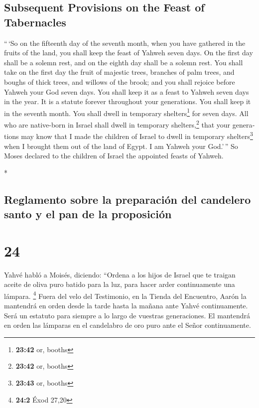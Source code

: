 \begin{paracol}{2}
\begin{otherlanguage}{english}
\hypertarget{subsequent-provisions-on-the-feast-of-tabernacles}{%
\subsection{Subsequent Provisions on the Feast of
Tabernacles}\label{subsequent-provisions-on-the-feast-of-tabernacles}}

 ``\,`So on the fifteenth day of the seventh month, when
you have gathered in the fruits of the land, you shall keep the feast of
Yahweh seven days. On the first day shall be a solemn rest, and on the
eighth day shall be a solemn rest.  You shall take on the
first day the fruit of majestic trees, branches of palm trees, and
boughs of thick trees, and willows of the brook; and you shall rejoice
before Yahweh your God seven days.  You shall keep it as
a feast to Yahweh seven days in the year. It is a statute forever
throughout your generations. You shall keep it in the seventh month.
 You shall dwell in temporary shelters\footnote{\textbf{23:42}
  or, booths} for seven days. All who are native-born in Israel shall
dwell in temporary shelters,\footnote{\textbf{23:42} or, booths}
 that your generations may know that I made the children
of Israel to dwell in temporary shelters\footnote{\textbf{23:43} or,
  booths} when I brought them out of the land of Egypt. I am Yahweh your
God.'\,''  So Moses declared to the children of Israel
the appointed feasts of Yahweh.

\end{otherlanguage}

\switchcolumn[0]*

\hypertarget{reglamento-sobre-la-preparaciuxf3n-del-candelero-santo-y-el-pan-de-la-proposiciuxf3n}{%
\subsection{Reglamento sobre la preparación del candelero santo y el pan
de la
proposición}\label{reglamento-sobre-la-preparaciuxf3n-del-candelero-santo-y-el-pan-de-la-proposiciuxf3n}}

\hypertarget{section-46}{%
\section{24}\label{section-46}}

 Yahvé habló a Moisés, diciendo:  ``Ordena a
los hijos de Israel que te traigan aceite de oliva puro batido para la
luz, para hacer arder continuamente una lámpara. \footnote{\textbf{24:2}
  Éxod 27,20}  Fuera del velo del Testimonio, en la Tienda
del Encuentro, Aarón la mantendrá en orden desde la tarde hasta la
mañana ante Yahvé continuamente. Será un estatuto para siempre a lo
largo de vuestras generaciones.  El mantendrá en orden las
lámparas en el candelabro de oro puro ante el Señor continuamente.


\end{paracol}

